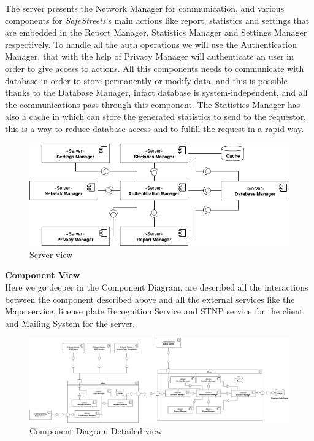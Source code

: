 \documentclass{article}
\begin{document}
The server presents the Network Manager for communication, and various components for \textit{SafeStreets}'s main actions
like report, statistics and settings that are embedded in the Report Manager, Statistics Manager and Settings
Manager respectively. To handle all the auth operations we will use the Authentication Manager, that with the 
help of Privacy Manager will authenticate an user in order to give access to actions. All this components needs 
to communicate with database in order to store permanently or modify data, and this is possible thanks to 
the Database Manager, infact database is system-independent, and all the communications pass through this 
component. The Statistics Manager has also a cache in which can store the generated statistics to send to the
requestor, this is a way to reduce database access and to fulfill the request in a rapid way.  
\begin{figure}[H]
    \centering
    \includegraphics[scale=0.6]{img/component_diagrams/server_component.png}
    \caption{Server view}
\end{figure}
\textbf{Component View}\\
Here we go deeper in the Component Diagram, are described all the interactions between the component
described above and all the external services like the Maps service, license plate Recognition Service and 
STNP service for the client and Mailing System for the server.

\begin{figure}[H]
    \includegraphics[width=1.2\textwidth, left]{img/component_diagrams/component_diagram_complete.png}
    \caption{Component Diagram Detailed view}
\end{figure}
\end{document}
